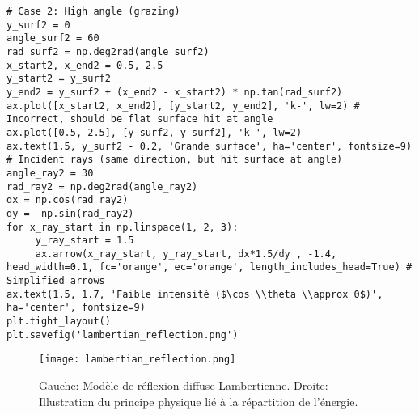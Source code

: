 \begin{verbatim}
# Case 2: High angle (grazing)
y_surf2 = 0
angle_surf2 = 60
rad_surf2 = np.deg2rad(angle_surf2)
x_start2, x_end2 = 0.5, 2.5
y_start2 = y_surf2
y_end2 = y_surf2 + (x_end2 - x_start2) * np.tan(rad_surf2)
ax.plot([x_start2, x_end2], [y_start2, y_end2], 'k-', lw=2) # Incorrect, should be flat surface hit at angle
ax.plot([0.5, 2.5], [y_surf2, y_surf2], 'k-', lw=2)
ax.text(1.5, y_surf2 - 0.2, 'Grande surface', ha='center', fontsize=9)
# Incident rays (same direction, but hit surface at angle)
angle_ray2 = 30
rad_ray2 = np.deg2rad(angle_ray2)
dx = np.cos(rad_ray2)
dy = -np.sin(rad_ray2)
for x_ray_start in np.linspace(1, 2, 3):
     y_ray_start = 1.5
     ax.arrow(x_ray_start, y_ray_start, dx*1.5/dy , -1.4, head_width=0.1, fc='orange', ec='orange', length_includes_head=True) # Simplified arrows
ax.text(1.5, 1.7, 'Faible intensité ($\cos \\theta \\approx 0$)', ha='center', fontsize=9)
plt.tight_layout()
plt.savefig('lambertian_reflection.png')
\end{verbatim}
\begin{figure}[H]
\centering
\texttt{[image: lambertian\_reflection.png]}
\caption{Gauche: Modèle de réflexion diffuse Lambertienne. Droite: Illustration du principe physique lié à la répartition de l'énergie.}
\label{fig:lambertian_reflection}
\end{figure}
